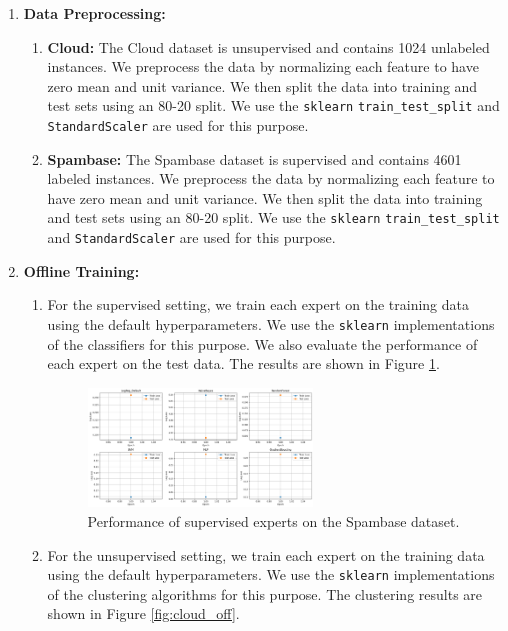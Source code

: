 \documentclass{article}
\begin{document}
\begin{enumerate}
    \item \textbf{Data Preprocessing:}
    \begin{enumerate}
      \item \textbf{Cloud:} The Cloud dataset is unsupervised and contains 1024 unlabeled instances. We preprocess the data by normalizing each feature to have zero mean and unit variance. We then split the data into training and test sets using an 80-20 split. We use the \texttt{sklearn} \texttt{train\_test\_split} and \texttt{StandardScaler} are used for this purpose.
      \item \textbf{Spambase:} The Spambase dataset is supervised and contains 4601 labeled instances. We preprocess the data by normalizing each feature to have zero mean and unit variance. We then split the data into training and test sets using an 80-20 split. We use the \texttt{sklearn} \texttt{train\_test\_split} and \texttt{StandardScaler} are used for this purpose.
    \end{enumerate}
    \item \textbf{Offline Training:}
    \begin{enumerate}
        \item For the supervised setting, we train each expert on the training data using the default hyperparameters. We use the \texttt{sklearn} implementations of the classifiers for this purpose. We also evaluate the performance of each expert on the test data. The results are shown in Figure \ref{fig:spambase_off}.
        \begin{figure}[ht]
          \centering
          \includegraphics[width=0.6\textwidth]{spambase_off.png}
          \caption{Performance of supervised experts on the Spambase dataset.}
          \label{fig:spambase_off}
        \end{figure}
        \item For the unsupervised setting, we train each expert on the training data using the default hyperparameters. We use the \texttt{sklearn} implementations of the clustering algorithms for this purpose. The clustering results are shown in Figure \ref{fig:cloud_off}.

\end{enumerate}
\end{enumerate}
\end{document}
